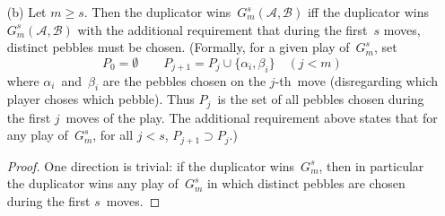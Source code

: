 \documentclass[letterpaper]{article}
\newcommand{\A}{\mathcal{A}}
\newcommand{\B}{\mathcal{B}}
\newcommand{\union}{\cup}
\theoremstyle{plain}
\begin{document}
\begin{enumerate}
\begin{proof}
We claim that $\pi:a_i\mapsto b_i$ is an isomorphism. Clearly $\pi$~is well-defined, bijective, and preserves order. By our claim and the assumption that the duplicator wins~$G_{\infty}^2$, it is immediate that $\pi$~also preserves the other relations in~$\tau$. Thus $\pi$~is an isomorphism.
\end{proof}
\item[(b)] Let $m\ge s$. Then the duplicator wins~$G_m^s(\A,\B)$ iff the duplicator wins~$G_m^s(\A,\B)$ with the additional requirement that during the first~$s$ moves, distinct pebbles must be chosen. (Formally, for a given play of~$G_m^s$, set
$$P_0=\emptyset\qquad P_{j+1}=P_j\union\{\alpha_i,\beta_i\}\quad(j<m)$$
where $\alpha_i$~and~$\beta_i$ are the pebbles chosen on the $j$-th~move (disregarding which player choses which pebble). Thus $P_j$~is the set of all pebbles chosen during the first $j$~moves of the play. The additional requirement above states that for any play of~$G_m^s$, for all $j<s$, $P_{j+1}\supset P_j$.)
\begin{proof}
One direction is trivial: if the duplicator wins~$G_m^s$, then in particular the duplicator wins any play of~$G_m^s$ in which distinct pebbles are chosen during the first $s$~moves.


\end{proof}
\end{enumerate}
\end{document}
